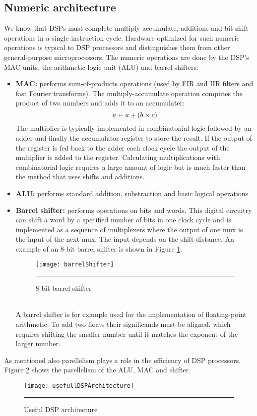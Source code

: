 \subsection{Numeric architecture}
We know that DSPs must complete multiply-accumulate, additions and bit-shift operations in a single instruction cycle. Hardware optimized for such numeric operations is typical to DSP processors and distinguishes them from other general-purpose microprocessors.
The numeric operations are done by the DSP's MAC units, the arithmetic-logic unit (ALU) and barrel shifters:
\begin{itemize}
\item \textbf{MAC:} performs sum-of-products operations (used by FIR and IIR filters and fast Fourier transforms). The multiply-accumulate operation computes the product of two numbers and adds it to an accumulater:
\begin{equation}
a \shortleftarrow  a + ( b \times c )
\end{equation}
The multiplier is typically implemented in combinatonial logic followed by an adder and finally the accumulator register to store the result. If the output of the register is fed back to the adder each clock cycle the output of the multiplier is added to the register. Calculating multiplications with combinatorial logic requires a large amount of logic but is much faster than the method that uses shifts and additions.
\item \textbf{ALU:} performs standard addition, substraction and basic logical operations
\item \textbf{Barrel shifter:} performs operations on bits and words. This digital circuitry can shift a word by a specified number of bits in one clock cycle and is implemented as a sequence of multiplexers where the output of one mux is the input of the next mux. The input depends on the shift distance. An example of an 8-bit barrel shifter is shown in Figure \ref{fig:barrelShifter}. 
\begin{figure}[htbp]
\centering
\texttt{[image: barrelShifter]}
\rule{30em}{0.5pt}
\caption[8-bit Barrel Shifter]{8-bit barrel shifter}
\label{fig:barrelShifter}
\end{figure} \\
A barrel shifter is for example used for the implementation of floating-point arithmetic. To add two floats their significands must be aligned, which requires shifting the smaller number until it matches the exponent of the larger number.
\end{itemize}
As mentioned also parellelism plays a role in the efficiency of DSP processors. Figure \ref{fig:dspArchitecture} shows the parellelism of the ALU, MAC and shifter.
\begin{figure}[htbp]
\centering
\texttt{[image: usefullDSPArchitecture]}
\rule{30em}{0.5pt}
\caption[DSP architecture]{Useful DSP architecture}
\label{fig:dspArchitecture}
\end{figure}
